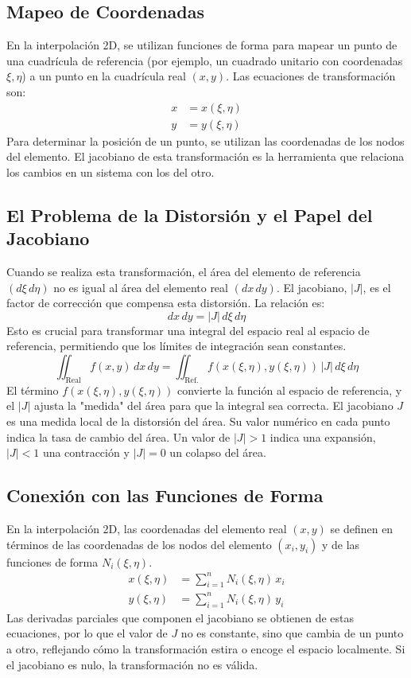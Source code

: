 \documentclass{article}
\begin{document}
\subsection*{Mapeo de Coordenadas}
En la interpolación 2D, se utilizan funciones de forma para mapear un punto de una cuadrícula de referencia (por ejemplo, un cuadrado unitario con coordenadas $\xi, \eta$) a un punto en la cuadrícula real $(x, y)$. Las ecuaciones de transformación son:
\begin{align*}
x &= x(\xi, \eta) \\
y &= y(\xi, \eta)
\end{align*}
Para determinar la posición de un punto, se utilizan las coordenadas de los nodos del elemento. El jacobiano de esta transformación es la herramienta que relaciona los cambios en un sistema con los del otro.

\subsection*{El Problema de la Distorsión y el Papel del Jacobiano}
Cuando se realiza esta transformación, el área del elemento de referencia $(d\xi\,d\eta)$ no es igual al área del elemento real $(dx\,dy)$. El jacobiano, $|J|$, es el factor de corrección que compensa esta distorsión. La relación es:
\[
dx\,dy = |J|\,d\xi\,d\eta
\]
Esto es crucial para transformar una integral del espacio real al espacio de referencia, permitiendo que los límites de integración sean constantes.
\[
\iint_{\text{Real}} f(x, y)\,dx\,dy = \iint_{\text{Ref.}} f(x(\xi, \eta), y(\xi, \eta))\,|J|\,d\xi\,d\eta
\]
El término $f(x(\xi, \eta), y(\xi, \eta))$ convierte la función al espacio de referencia, y el $|J|$ ajusta la "medida" del área para que la integral sea correcta.
El jacobiano $J$ es una medida local de la distorsión del área. Su valor numérico en cada punto indica la tasa de cambio del área. Un valor de $|J| > 1$ indica una expansión, $|J| < 1$ una contracción y $|J| = 0$ un colapso del área.


\subsection*{Conexión con las Funciones de Forma}
En la interpolación 2D, las coordenadas del elemento real $(x, y)$ se definen en términos de las coordenadas de los nodos del elemento $(x_i, y_i)$ y de las funciones de forma $N_i(\xi, \eta)$.
\begin{align*}
x(\xi, \eta) &= \sum_{i=1}^{n} N_i(\xi, \eta)\,x_i \\
y(\xi, \eta) &= \sum_{i=1}^{n} N_i(\xi, \eta)\,y_i
\end{align*}
Las derivadas parciales que componen el jacobiano se obtienen de estas ecuaciones, por lo que el valor de $J$ no es constante, sino que cambia de un punto a otro, reflejando cómo la transformación estira o encoge el espacio localmente. Si el jacobiano es nulo, la transformación no es válida.
\end{document}
